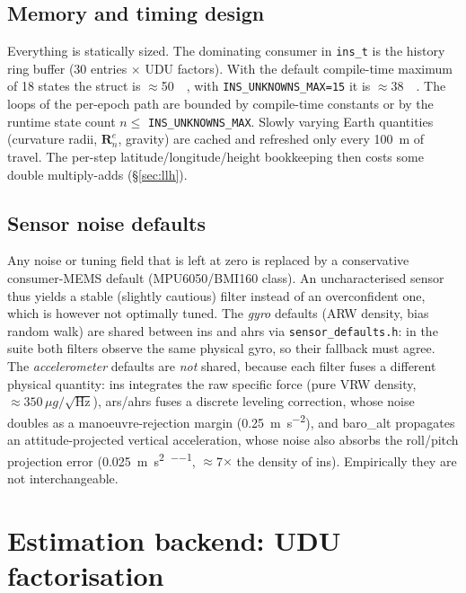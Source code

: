 \documentclass[11pt,a4paper]{article}
\newcommand{\mat}[1]{\bm{#1}}
\newcommand{\nframe}{n}
\newcommand{\eframe}{e}
\newcommand{\Rne}{\mat{R}_{\nframe}^{\eframe}}
\newcommand{\code}[1]{\texttt{#1}}
\begin{document}
\subsection{Memory and timing design}

Everything is statically sized. The dominating consumer in
\code{ins\_\allowbreak{}t} is the history ring buffer (30 entries $\times$
UDU factors). With the default compile-time maximum of 18 states the
struct is $\approx$\SI{50}{\kibi\byte}, with
\code{INS\_\allowbreak{}UNKNOWNS\_\allowbreak{}MAX=15} it is
$\approx$\SI{38}{\kibi\byte}.
The loops of the per-epoch path are bounded by compile-time constants or by the
runtime state count $n \le$ \code{INS\_\allowbreak{}UNKNOWNS\_\allowbreak{}MAX}.
Slowly varying Earth quantities (curvature radii, $\Rne$, gravity) are cached
and refreshed only every \SI{100}{\metre} of travel. The per-step
latitude/longitude/height bookkeeping then costs some double
multiply-adds (\S\ref{sec:llh}).

\subsection{Sensor noise defaults}
\label{sec:defaults}

Any noise or tuning field that is left at zero is replaced by a conservative
consumer-MEMS default (MPU6050/BMI160 class). An uncharacterised sensor thus
yields a stable (slightly cautious) filter instead of an overconfident one,
which is however not optimally tuned. The \emph{gyro} defaults (ARW density,
bias random walk) are shared between ins and ahrs via
\code{sensor\_\allowbreak{}defaults.h}: in the suite both filters observe the
same physical gyro, so their fallback must agree. The \emph{accelerometer}
defaults are \emph{not} shared, because each filter fuses a different physical
quantity: ins integrates the raw specific force (pure VRW density,
$\approx\!350\,\mu g/\sqrt{\text{Hz}}$), ars/ahrs fuses a discrete leveling
correction, whose noise doubles as a manoeuvre-rejection margin
(\SI{0.25}{\metre\per\second\squared}), and baro\_alt propagates an
attitude-projected vertical acceleration, whose noise also absorbs the
roll/pitch projection error
(\SI{0.025}{\metre\per\second\squared\per\sqrt{\hertz}},
$\approx$7$\times$ the density of ins). Empirically they are not
interchangeable.
\section{Estimation backend: UDU factorisation}
\label{sec:udu}
\end{document}
